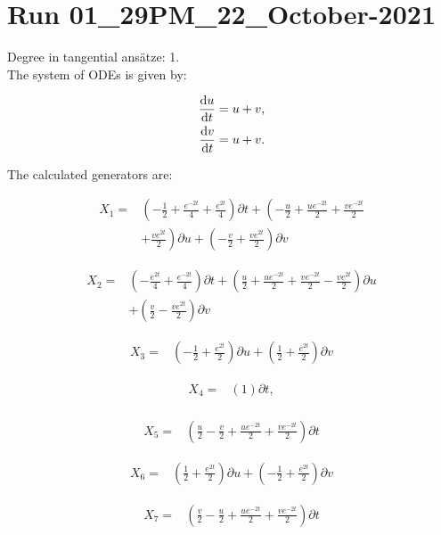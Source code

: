 \section*{Run 01\_29PM\_22\_October-2021}
Degree in tangential ansätze:	1.\\
The system of ODEs is given by:

\begin{align*}
\dv{u}{t}&=u + v,\\
\dv{v}{t}&=u + v.\\
\end{align*}

\noindent The calculated generators are:

\begin{align*}
X_{1}=&\left(- \frac{1}{2}+\frac{e^{- 2 t}}{4}+\frac{e^{2 t}}{4} \right)\partial t+\left(- \frac{u}{2}+\frac{u e^{- 2 t}}{2}+\frac{v e^{- 2 t}}{2}\right.\\
&+\left.\frac{v e^{2 t}}{2} \right)\partial u+\left(- \frac{v}{2}+\frac{v e^{2 t}}{2} \right)\partial v
\end{align*}

\begin{align*}
X_{2}=&\left(- \frac{e^{2 t}}{4}+\frac{e^{- 2 t}}{4} \right)\partial t+\left(\frac{u}{2}+\frac{u e^{- 2 t}}{2}+\frac{v e^{- 2 t}}{2}- \frac{v e^{2 t}}{2} \right)\partial u\\
&+\left(\frac{v}{2}- \frac{v e^{2 t}}{2} \right)\partial v
\end{align*}

\begin{align*}
X_{3}=&\left(- \frac{1}{2}+\frac{e^{2 t}}{2} \right)\partial u+\left(\frac{1}{2}+\frac{e^{2 t}}{2} \right)\partial v
\end{align*}

\begin{align*}
X_{4}=&\left(1 \right)\partial t,\\
\end{align*}

\begin{align*}
X_{5}=&\left(\frac{u}{2}- \frac{v}{2}+\frac{u e^{- 2 t}}{2}+\frac{v e^{- 2 t}}{2} \right)\partial t
\end{align*}

\begin{align*}
X_{6}=&\left(\frac{1}{2}+\frac{e^{2 t}}{2} \right)\partial u+\left(- \frac{1}{2}+\frac{e^{2 t}}{2} \right)\partial v
\end{align*}

\begin{align*}
X_{7}=&\left(\frac{v}{2}- \frac{u}{2}+\frac{u e^{- 2 t}}{2}+\frac{v e^{- 2 t}}{2} \right)\partial t
\end{align*}

